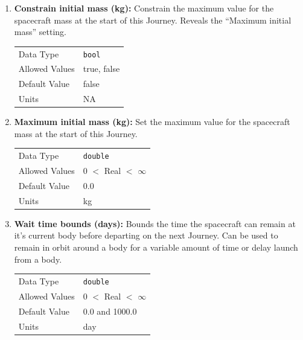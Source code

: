 \begin{enumerate}
    \item \textbf{Constrain initial mass (kg):} Constrain the maximum value for the spacecraft mass at the start of this Journey. Reveals the ``Maximum initial mass'' setting.

        \begin{table}[H]
            \hspace{2cm}
            \begin{tabular}{ll}
            Data Type & \verb|bool| \\
            Allowed Values & true, false \\
            Default Value & false \\
            Units & NA
            \end{tabular}
        \end{table}

        \item \textbf{Maximum initial mass (kg):} Set the maximum value for the spacecraft mass at the start of this Journey.
        
            \begin{table}[H]
                \hspace{2cm}
                \begin{tabular}{ll}
                Data Type & \verb|double| \\
                Allowed Values & 0 $<$ Real $<$ $\infty$ \\
                Default Value & 0.0 \\
                Units & kg
                \end{tabular}
            \end{table}



    \item \textbf{Wait time bounds (days):} Bounds the time the spacecraft can remain at it's current body before departing on the next Journey. Can be used to remain in orbit around a body for a variable amount of time or delay launch from a body. 

        \begin{table}[H]
            \hspace{2cm}
            \begin{tabular}{ll}
            Data Type & \verb|double| \\
            Allowed Values & 0 $<$ Real $<$ $\infty$ \\
            Default Value & 0.0 and 1000.0\\
            Units & day
            \end{tabular}
        \end{table}


\end{enumerate}
